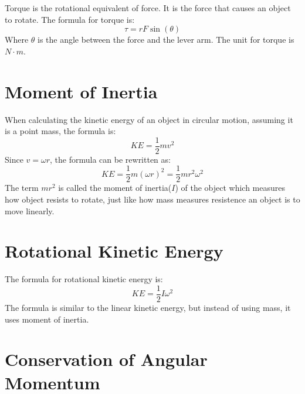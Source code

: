 \documentclass[]{article}
\begin{document}
        Torque is the rotational equivalent of force. It is the force that
        causes an object to rotate. The formula for torque is:
        \[\tau = r F \sin(\theta)\]
        Where $\theta$ is the angle between the force and the lever arm. The
        unit for torque is $N \cdot m$.
    \section{Moment of Inertia}
    When calculating the kinetic energy of an object in circular motion,
    assuming it is a point mass, the formula is:
        \[KE = \frac{1}{2}mv^2\]
    Since $v = \omega r$, the formula can be rewritten as:
        \[KE = \frac{1}{2}m(\omega r)^2 = \frac{1}{2}m r^2 \omega^2\]
    The term $mr^2$ is called the moment of inertia($I$) of the object which
    measures how object resists to rotate, just like how mass measures
    resistence an object is to move linearly.
    \section{Rotational Kinetic Energy}
    The formula for rotational kinetic energy is:
        \[KE = \frac{1}{2} I \omega^2\]
    The formula is similar to the linear kinetic energy, but instead of using
    mass, it uses moment of inertia.
    \section{Conservation of Angular Momentum}
\end{document}
